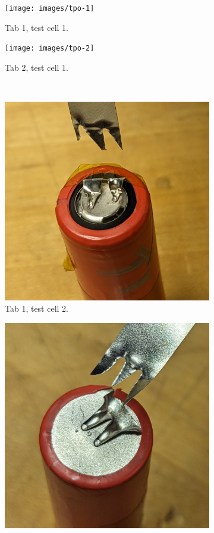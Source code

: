 \documentclass{article}
\begin{document}
\begin{figure}[H]
\centering

\begin{subfigure}{0.3\textwidth}
\texttt{[image: images/tpo-1]}
\caption{Tab 1, test cell 1.}
\label {fig:peel-1}
\end{subfigure}
\hfill
\begin{subfigure}{0.3\textwidth}
\texttt{[image: images/tpo-2]}
\caption{Tab 2, test cell 1.}
\label {fig:peel-2}
\end{subfigure}
\\
\begin{subfigure}{0.3\textwidth}
\includegraphics[width=\textwidth]{images/tpo-3}
\caption{Tab 1, test cell 2.}
\label {fig:peel-3}
\end{subfigure}
\hfill
\begin{subfigure}{0.3\textwidth}
\includegraphics[width=\textwidth]{images/tpo-4}

\end{subfigure}
\end{figure}
\end{document}
